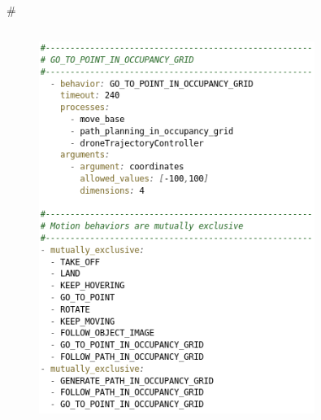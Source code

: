 \documentclass[]{beamer}
\newcommand{\mSlideTitle}{{{\color{gray}\secname}} \# \subsecname}
\begin{document}
\begin{frame}{\mSlideTitle}
\begin{columns}
\begin{column}{0.45\textwidth}
\begin{figure}
        \includegraphics[width=0.8\textwidth,keepaspectratio]{BehaviorGTPCatalogVertical.png}
      \end{figure}
    \end{column}
  \end{columns}
\end{frame}
\end{document}
